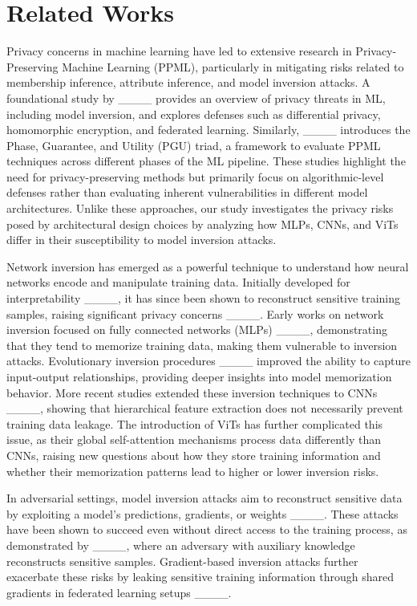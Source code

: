 \section{Related Works}
Privacy concerns in machine learning have led to extensive research in Privacy-Preserving Machine Learning (PPML), particularly in mitigating risks related to membership inference, attribute inference, and model inversion attacks. A foundational study by ____ provides an overview of privacy threats in ML, including model inversion, and explores defenses such as differential privacy, homomorphic encryption, and federated learning. Similarly, ____ introduces the Phase, Guarantee, and Utility (PGU) triad, a framework to evaluate PPML techniques across different phases of the ML pipeline. These studies highlight the need for privacy-preserving methods but primarily focus on algorithmic-level defenses rather than evaluating inherent vulnerabilities in different model architectures. Unlike these approaches, our study investigates the privacy risks posed by architectural design choices by analyzing how MLPs, CNNs, and ViTs differ in their susceptibility to model inversion attacks.

Network inversion has emerged as a powerful technique to understand how neural networks encode and manipulate training data. Initially developed for interpretability ____, it has since been shown to reconstruct sensitive training samples, raising significant privacy concerns ____. Early works on network inversion focused on fully connected networks (MLPs) ____, demonstrating that they tend to memorize training data, making them vulnerable to inversion attacks. Evolutionary inversion procedures ____ improved the ability to capture input-output relationships, providing deeper insights into model memorization behavior. More recent studies extended these inversion techniques to CNNs ____, showing that hierarchical feature extraction does not necessarily prevent training data leakage. The introduction of ViTs has further complicated this issue, as their global self-attention mechanisms process data differently than CNNs, raising new questions about how they store training information and whether their memorization patterns lead to higher or lower inversion risks.

In adversarial settings, model inversion attacks aim to reconstruct sensitive data by exploiting a model's predictions, gradients, or weights ____. These attacks have been shown to succeed even without direct access to the training process, as demonstrated by ____, where an adversary with auxiliary knowledge reconstructs sensitive samples. Gradient-based inversion attacks further exacerbate these risks by leaking sensitive training information through shared gradients in federated learning setups ____.

